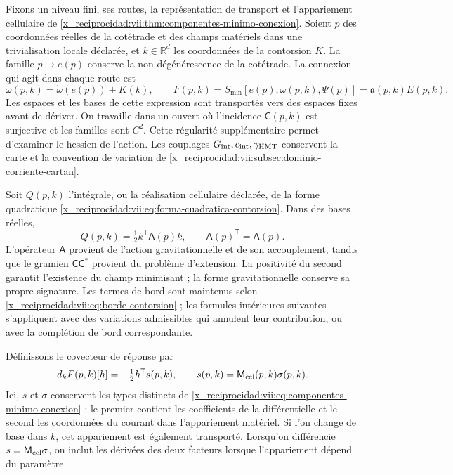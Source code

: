 Fixons un niveau fini, ses routes, la représentation de transport et
l'appariement cellulaire de
\ref{x_reciprocidad:vii:thm:componentes-minimo-conexion}. Soient \(p\) des coordonnées
réelles de la cotétrade et des champs matériels dans une trivialisation
locale déclarée, et \(k\in\mathbb R^d\) les coordonnées de la
contorsion \(K\). La famille \(p\mapsto e(p)\) conserve la
non-dégénérescence de la cotétrade. La connexion qui agit dans chaque route est
\begin{equation}
 \omega(p,k)=\mathring\omega(e(p))+K(k),\qquad
 F(p,k)=S_{\min}[e(p),\omega(p,k),\Psi(p)]
       =\mathfrak a(p,k)E(p,k).
 \label{x_reciprocidad:vii:eq:accion-minima-en-contorsion}
\end{equation}
Les espaces et les bases de cette expression sont transportés vers des espaces
fixes avant de dériver. On travaille dans un ouvert où l'incidence
\(\mathsf C(p,k)\) est surjective et les familles sont \(C^2\).
Cette régularité supplémentaire permet d'examiner le hessien de l'action.
Les couplages \(G_{\rm int},c_{\rm int},\gamma_{\rm HMT}\)
conservent la carte et la convention de variation de
\ref{x_reciprocidad:vii:subsec:dominio-corriente-cartan}.

Soit \(Q(p,k)\) l'intégrale, ou la réalisation cellulaire déclarée, de
la forme quadratique
\eqref{x_reciprocidad:vii:eq:forma-cuadratica-contorsion}. Dans des bases réelles,
\begin{equation}
 Q(p,k)=\tfrac12 k^{\mathsf T}\mathsf A(p)k,
 \qquad \mathsf A(p)^{\mathsf T}=\mathsf A(p).
 \label{x_reciprocidad:vii:eq:cuadratica-celular-contorsion}
\end{equation}
L'opérateur \(\mathsf A\) provient de l'action gravitationnelle et de son accouplement, tandis que le gramien \(\mathsf C\mathsf C^*\) provient du problème d'extension. La positivité du second garantit l'existence du champ minimisant ; la forme gravitationnelle conserve sa propre signature. Les termes de bord sont maintenus selon \eqref{x_reciprocidad:vii:eq:borde-contorsion} ; les formules intérieures suivantes s'appliquent avec des variations admissibles qui annulent leur contribution, ou avec la complétion de bord correspondante.

Définissons le covecteur de réponse par
\begin{equation}
 d_kF(p,k)[h]= -\tfrac12 h^{\mathsf T}s(p,k),
 \qquad s(p,k)=\mathsf M_{\rm cel}(p,k)\sigma(p,k).
 \label{x_reciprocidad:vii:eq:covector-torsional-minimo}
\end{equation}
Ici, \(s\) et \(\sigma\) conservent les types distincts de
\eqref{x_reciprocidad:vii:eq:componentes-minimo-conexion} : le premier contient les
coefficients de la différentielle et le second les coordonnées du
courant dans l'appariement matériel. Si l'on change de base dans
\(k\), cet appariement est également transporté. Lorsqu'on différencie
\(s=\mathsf M_{\rm cel}\sigma\), on inclut les dérivées des
deux facteurs lorsque l'appariement dépend du paramètre.

